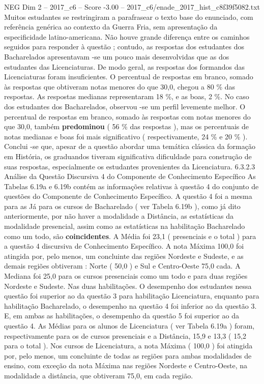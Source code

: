 \begin{textsample}{NEG Dim 2 – 2017\_c6 – Score -3.00 – 2017\_c6/enade\_2017\_hist\_c8f39f5082.txt}
Muitos estudantes se restringiram a parafrasear o texto base do enunciado, com referência genérica ao contexto da Guerra Fria, sem apresentação da especificidade latino-americana.
Não houve grande diferença entre os caminhos seguidos para responder à questão ; contudo, as respostas dos estudantes dos Bacharelados apresentavam -se um pouco mais desenvolvidas que as dos estudantes das Licenciaturas.
De modo geral, as respostas dos formandos das Licenciaturas foram insuficientes.
O percentual de respostas em branco, somado às respostas que obtiveram notas menores do que 30,0, chegou a 80 \% das respostas.
As respostas medianas representaram 18 \%, e as boas, 2 \%.
No caso dos estudantes dos Bacharelados, observou -se um perfil levemente melhor.
O percentual de respostas em branco, somado às respostas com notas menores do que 30,0, também \textbf{predominou} ( 56 \% das respostas ), mas os percentuais de notas medianas e boas foi mais significativo ( respectivamente, 24 \% e 20 \% ).
Conclui -se que, apesar de a questão abordar uma temática clássica da formação em História, os graduandos tiveram significativa dificuldade para construção de suas respostas, especialmente os estudantes provenientes da Licenciatura. 6.3.2.3 Análise da Questão Discursiva 4 do Componente de Conhecimento Específico As Tabelas 6.19a e 6.19b contém as informações relativas à questão 4 do conjunto de questões do Componente de Conhecimento Específico.
A questão 4 foi a mesma para as Já para os cursos de Bacharelado ( ver Tabela 6.19b ), como já dito anteriormente, por não haver a modalidade a Distância, as estatísticas da modalidade presencial, assim como as estatísticas na habilitação Bacharelado como um todo, são \textbf{coincidentes}.
A Média foi 23,1 ( presenciais e o total ) para a questão 4 discursiva de Conhecimento Específico.
A nota Máxima 100,0 foi atingida por, pelo menos, um concluinte das regiões Nordeste e Sudeste, e as demais regiões obtiveram : Norte ( 50,0 ) e Sul e Centro-Oeste 75,0 cada.
A Mediana foi 25,0 para os cursos presenciais como um todo e para duas regiões Nordeste e Sudeste.
Nas duas habilitações.
O desempenho dos estudantes nessa questão foi superior ao da questão 3 para habilitação Licenciatura, enquanto para habilitação Bacharelado, o desempenho na questão 4 foi inferior ao da questão 3.
E, em ambas as habilitações, o desempenho da questão 5 foi superior ao da questão 4.
As Médias para os alunos de Licenciatura ( ver Tabela 6.19a ) foram, respectivamente para os de cursos presenciais e a Distância, 15,9 e 13,3 ( 15,2 para o total ).
Nos cursos de Licenciatura, a nota Máxima ( 100,0 ) foi atingida por, pelo menos, um concluinte de todas as regiões para ambas modalidades de ensino, com exceção da nota Máxima nas regiões Nordeste e Centro-Oeste, na modalidade a distância, que obtiveram 75,0, em cada região.

\end{textsample}
